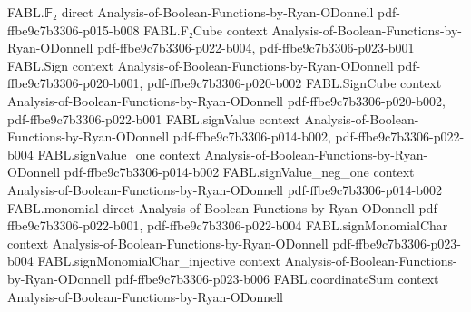 \begin{theorem}
\label{FABL.outer_rejection_div_le_composed_rejection}
\leanok
{}
\proofstep
  {FABL.𝔽₂}
  {direct}
  {Analysis-of-Boolean-Functions-by-Ryan-ODonnell}
  {pdf-ffbe9c7b3306-p015-b008}
\proofstep
  {FABL.F₂Cube}
  {context}
  {Analysis-of-Boolean-Functions-by-Ryan-ODonnell}
  {pdf-ffbe9c7b3306-p022-b004,
    pdf-ffbe9c7b3306-p023-b001}
\proofstep
  {FABL.Sign}
  {context}
  {Analysis-of-Boolean-Functions-by-Ryan-ODonnell}
  {pdf-ffbe9c7b3306-p020-b001,
    pdf-ffbe9c7b3306-p020-b002}
\proofstep
  {FABL.SignCube}
  {context}
  {Analysis-of-Boolean-Functions-by-Ryan-ODonnell}
  {pdf-ffbe9c7b3306-p020-b002,
    pdf-ffbe9c7b3306-p022-b001}
\proofstep
  {FABL.signValue}
  {context}
  {Analysis-of-Boolean-Functions-by-Ryan-ODonnell}
  {pdf-ffbe9c7b3306-p014-b002,
    pdf-ffbe9c7b3306-p022-b004}
\proofstep
  {FABL.signValue_one}
  {context}
  {Analysis-of-Boolean-Functions-by-Ryan-ODonnell}
  {pdf-ffbe9c7b3306-p014-b002}
\proofstep
  {FABL.signValue_neg_one}
  {context}
  {Analysis-of-Boolean-Functions-by-Ryan-ODonnell}
  {pdf-ffbe9c7b3306-p014-b002}
\proofstep
  {FABL.monomial}
  {direct}
  {Analysis-of-Boolean-Functions-by-Ryan-ODonnell}
  {pdf-ffbe9c7b3306-p022-b001,
    pdf-ffbe9c7b3306-p022-b004}
\proofstep
  {FABL.signMonomialChar}
  {context}
  {Analysis-of-Boolean-Functions-by-Ryan-ODonnell}
  {pdf-ffbe9c7b3306-p023-b004}
\proofstep
  {FABL.signMonomialChar_injective}
  {context}
  {Analysis-of-Boolean-Functions-by-Ryan-ODonnell}
  {pdf-ffbe9c7b3306-p023-b006}
\proofstep
  {FABL.coordinateSum}
  {context}
  {Analysis-of-Boolean-Functions-by-Ryan-ODonnell}

\end{theorem}
